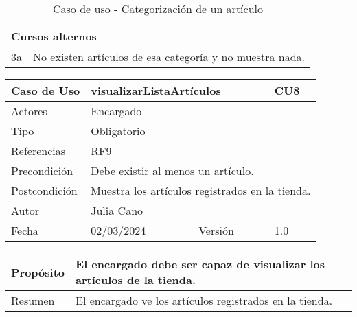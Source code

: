 \begin{table}[H]
	\centering
	\begin{tabular}{| m{} | m{} | m{} | m{} |}
		\hline
		\multicolumn{4}{|m{0.9\textwidth}|}{Cursos alternos}     \\ 
		\hline
		3a & \multicolumn{3}{m{0.67\textwidth}|}{No existen artículos de esa categoría y no muestra nada.} \\ 
		\hline
	\end{tabular}
	\caption{Caso de uso - Categorización de un artículo}
\end{table}

\newpage


\begin{table}[H]
	\centering
	\begin{tabular}{| m{} | m{} | m{} | m{}|}
		\hline
		\rowcolor{grayshade} Caso de Uso & \multicolumn{2}{|m{0.43\textwidth}|}{visualizarListaArtículos} &  CU8\\ 
		\hline
		Actores & \multicolumn{3}{l|}{Encargado} \\ 
		\hline
		Tipo & \multicolumn{3}{l|}{Obligatorio} \\ 
		\hline
		Referencias & \multicolumn{3}{l|}{RF9} \\ 
		\hline
		Precondición & \multicolumn{3}{m{0.67\textwidth}|}{Debe existir al menos un artículo.} \\ 
		\hline
		Postcondición & \multicolumn{3}{m{0.67\textwidth}|}{Muestra los artículos registrados en la tienda.} \\ 
		\hline
		Autor & \multicolumn{3}{l|}{Julia Cano} \\ 
		\hline
		Fecha & 02/03/2024 & Versión & 1.0 \\
		\hline
	\end{tabular}
\end{table}

\begin{table}[H]
	\centering
	\begin{tabular}{| m{} | m{} | m{} | m{} |}
		\hline
		Propósito & \multicolumn{3}{m{0.67\textwidth}|}{El encargado debe ser capaz de visualizar los artículos de la tienda.}  \\ 
		\hline
		Resumen & \multicolumn{3}{m{0.67\textwidth}|}{El encargado ve los artículos registrados en la tienda.} \\ 
		\hline
	\end{tabular}
\end{table}


